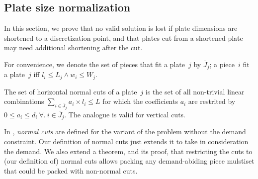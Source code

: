 \documentclass[runningheads]{llncs}
\begin{document}




\subsection{Plate size normalization}

In this section, we prove that no valid solution is lost if plate dimensions are shortened to a discretization point, and that plates cut from a shortened plate may need additional shortening after the cut.

For convenience, we denote the set of pieces that fit a plate~\(j\) by \(\bar{J}_j\); a piece~\(i\) fit a plate~\(j\) iff \(l_i \leq L_j \land w_i \leq W_j\).


\begin{definition}
The set of horizontal normal cuts of a plate~\(j\) is the set of all non-trivial linear combinations \(\sum_{i \in \bar{J}_j} a_i \times l_i \leq L\) for which the coefficients \(a_i\) are restrited by \(0 \leq a_i \leq d_i~\forall.~i \in \bar{J}_j\). The analogue is valid for vertical cuts.
\end{definition}

In \cite{nicos:1977}, \emph{normal cuts} are defined for the variant of the problem without the demand constraint.
Our definition of normal cuts just extends it to take in consideration the demand.
We also extend a theorem, and its proof, that restricting the cuts to (our definition of) normal cuts allows packing any demand-abiding piece mulstiset that could be packed with non-normal cuts.
\end{document}
